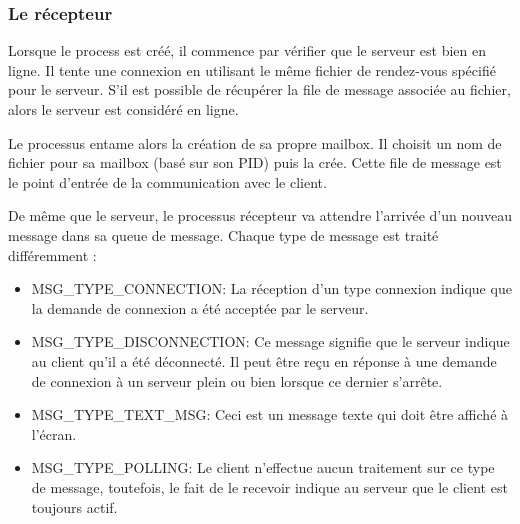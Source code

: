 \documentclass{article}
\begin{document}
	\subsubsection{Le récepteur} 
	\par Lorsque le process est créé, il commence par vérifier que le serveur est bien en ligne. Il tente une connexion en utilisant le même fichier de rendez-vous spécifié pour le serveur. S'il est possible de récupérer la file de message associée au fichier, alors le serveur est considéré en ligne.
	\par Le processus entame alors la création de sa propre mailbox. Il choisit un nom de fichier pour sa mailbox (basé sur son PID) puis la crée. Cette file de message est le point d'entrée de la communication avec le client.
	\par De même que le serveur, le processus récepteur va attendre l'arrivée d'un nouveau message dans sa queue de message. Chaque type de message est traité différemment :
	\begin{itemize}\renewcommand{\labelitemi}{$\bullet$} 
		\item MSG\_TYPE\_CONNECTION: La réception d'un type connexion indique que la demande de connexion a été acceptée par le serveur.
		\item MSG\_TYPE\_DISCONNECTION: Ce message signifie que le serveur indique au client qu'il a été déconnecté. Il peut être reçu en réponse à une demande de connexion à un serveur plein ou bien lorsque ce dernier s'arrête.
		\item MSG\_TYPE\_TEXT\_MSG: Ceci est un message texte qui doit être affiché à l'écran.
		\item MSG\_TYPE\_POLLING: Le client n'effectue aucun traitement sur ce type de message, toutefois, le fait de le recevoir indique au serveur que le client est toujours actif.
	\end{itemize}
\end{document}
